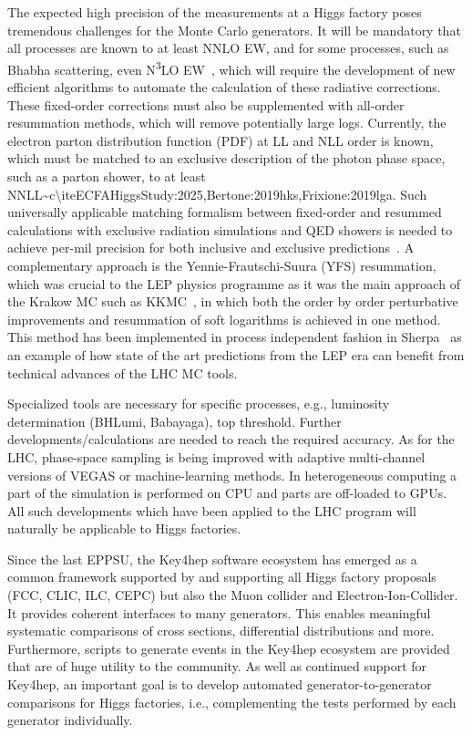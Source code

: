 \documentclass[10pt,a4paper]{article}
\begin{document}
The expected high precision of the measurements at a Higgs factory poses
tremendous challenges for the Monte Carlo generators. It will be
mandatory that all processes are known to at least NNLO EW, and for some
processes, such as Bhabha scattering, even N\textsuperscript{3}LO
EW~\cite{ECFAHiggsStudy:2025}, which will
require the development of new efficient algorithms to automate the
calculation of these radiative corrections. These fixed-order
corrections must also be supplemented with all-order resummation
methods, which will remove potentially large logs. Currently, the
electron parton distribution function (PDF) at LL and NLL order is
known, which must be matched to an exclusive description of the photon
phase space, such as a parton shower, to at least
NNLL\textasciitilde c\textbackslash ite{ECFAHiggsStudy:2025,Bertone:2019hks,Frixione:2019lga}.
Such universally applicable matching formalism between fixed-order and
resummed calculations with exclusive radiation simulations and QED
showers is needed to achieve per-mil precision for both inclusive and
exclusive
predictions~\cite{Frixione:2022ofv}. A
complementary approach is the Yennie-Frautschi-Suura (YFS) resummation,
which was crucial to the LEP physics programme as it was the main
approach of the Krakow MC such as
KKMC~\cite{Jadach:1999vf}, in which both
the order by order perturbative improvements and resummation of soft
logarithms is achieved in one method. This method has been implemented
in process independent fashion in
Sherpa~\cite{Krauss:2022ajk} as an example
of how state of the art predictions from the LEP era can benefit from
technical advances of the LHC MC tools.

Specialized tools are necessary for specific processes, e.g., luminosity
determination (BHLumi, Babayaga), top threshold. Further
developments/calculations are needed to reach the required accuracy. As
for the LHC, phase-space sampling is being improved with adaptive
multi-channel versions of VEGAS or machine-learning methods. In
heterogeneous computing a part of the simulation is performed on CPU and
parts are off-loaded to GPUs. All such developments which have been
applied to the LHC program will naturally be applicable to Higgs
factories.

Since the last EPPSU, the Key4hep software ecosystem has emerged as a
common framework supported by and supporting all Higgs factory proposals
(FCC, CLIC, ILC, CEPC) but also the Muon collider and
Electron-Ion-Collider. It provides coherent interfaces to many
generators. This enables meaningful systematic comparisons of cross
sections, differential distributions and more. Furthermore, scripts to
generate events in the Key4hep ecosystem are provided that are of huge
utility to the community. As well as continued support for Key4hep, an
important goal is to develop automated generator-to-generator
comparisons for Higgs factories, i.e., complementing the tests performed
by each generator individually.
\end{document}
